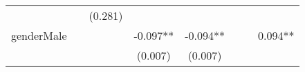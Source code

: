 \documentclass[12pt,twoside]{reedthesis}
\begin{document}
\begin{longtable}[]{@{}lccccccc@{}}
\begin{minipage}[t]{0.10\columnwidth}
  \strut
  \end{minipage} & \begin{minipage}[t]{0.10\columnwidth}\centering\strut
  \strut
  \end{minipage} & \begin{minipage}[t]{0.10\columnwidth}\centering\strut
  (0.281)\strut
  \end{minipage}\tabularnewline
  \begin{minipage}[t]{0.12\columnwidth}\raggedright\strut
  genderMale\strut
  \end{minipage} & \begin{minipage}[t]{0.09\columnwidth}\centering\strut
  \strut
  \end{minipage} & \begin{minipage}[t]{0.10\columnwidth}\centering\strut
  \strut
  \end{minipage} & \begin{minipage}[t]{0.10\columnwidth}\centering\strut
  -0.097**\strut
  \end{minipage} & \begin{minipage}[t]{0.10\columnwidth}\centering\strut
  -0.094**\strut
  \end{minipage} & \begin{minipage}[t]{0.10\columnwidth}\centering\strut
  \strut
  \end{minipage} & \begin{minipage}[t]{0.10\columnwidth}\centering\strut
  \strut
  \end{minipage} & \begin{minipage}[t]{0.10\columnwidth}\centering\strut
  0.094**\strut
  \end{minipage}\tabularnewline
  \begin{minipage}[t]{0.12\columnwidth}\raggedright\strut
  \strut
  \end{minipage} & \begin{minipage}[t]{0.09\columnwidth}\centering\strut
  \strut
  \end{minipage} & \begin{minipage}[t]{0.10\columnwidth}\centering\strut
  \strut
  \end{minipage} & \begin{minipage}[t]{0.10\columnwidth}\centering\strut
  (0.007)\strut
  \end{minipage} & \begin{minipage}[t]{0.10\columnwidth}\centering\strut
  (0.007)\strut
  \end{minipage} & \begin{minipage}[t]{0.10\columnwidth}\centering\strut

\end{minipage}
\end{longtable}
\end{document}
